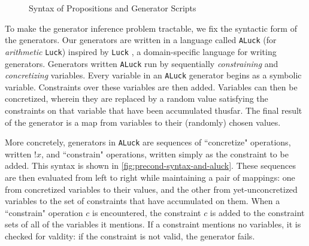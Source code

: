 \documentclass[sigconf,nonacm,review,anonymous]{acmart}
\begin{document}
\begin{figure}
\vspace{-10px}
\caption{Syntax of Propositions and Generator Scripts}
\label{fig:precond-syntax-and-aluck}

\vspace{-15px}
\end{figure}

To make the generator inference problem tractable, we fix the
syntactic form of the generators. Our generators are written
in a language called \texttt{ALuck} (for \textit{arithmetic} \texttt{Luck})
inspired by \texttt{Luck} \cite{luck}, a domain-specific language for writing
generators. Generators written \texttt{ALuck} run by sequentially \textit{constraining} and
\textit{concretizing} variables. Every variable in an \texttt{ALuck} generator
begins as a symbolic variable. Constraints over these variables are then added.
Variables can then be concretized, wherein they are replaced by a random value
satisfying the constraints on that variable that have been accumulated thusfar.
The final result of the generator is a map from variables to their (randomly)
chosen values.

More concretely, generators in \texttt{ALuck} are sequences of ``concretize"
operations, written $!x$, and ``constrain" operations, written simply as the
constraint to be added. This syntax is shown in
\autoref{fig:precond-syntax-and-aluck}. These sequences are then evaluated from left to
right while maintaining a pair of mappings: one from concretized variables to
their values, and the other from yet-unconcretized variables to the set of
constraints that have accumulated on them.  When a ``constrain" operation $c$ is
encountered, the constraint $c$ is added to the constraint sets of all of the
variables it mentions. If a constraint mentions no variables, it is checked for
valdity: if the constraint is not valid, the generator fails.
\end{document}
